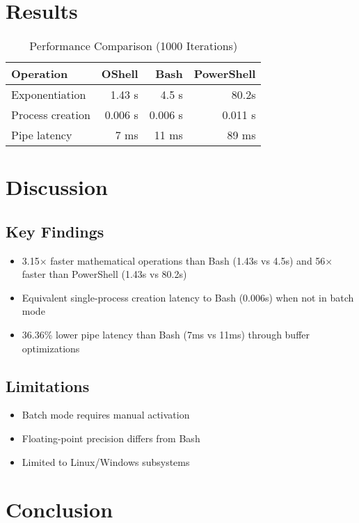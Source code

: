\documentclass[10pt,twocolumn]{article}
\begin{document}
\section{Results}

\begin{table}[ht]
\centering
\caption{Performance Comparison (1000 Iterations)}
\label{tab:results}
\begin{tabular}{@{}lrrr@{}}
\toprule
\textbf{Operation} & \textbf{OShell} & \textbf{Bash} & \textbf{PowerShell} \\
\midrule
Exponentiation & 1.43 s & 4.5 s & 80.2s \\
Process creation & 0.006 s & 0.006 s & 0.011 s \\
Pipe latency & 7 ms & 11 ms & 89 ms \\
\bottomrule
\end{tabular}
\end{table}

\section{Discussion}
\subsection{Key Findings}
\begin{itemize}
\item 3.15$\times$ faster mathematical operations than Bash (1.43s vs 4.5s) and 56$\times$ faster than PowerShell (1.43s vs 80.2s)
\item Equivalent single-process creation latency to Bash (0.006s) when not in batch mode
\item 36.36\% lower pipe latency than Bash (7ms vs 11ms) through buffer optimizations
\end{itemize}

\subsection{Limitations}
\begin{itemize}
\item Batch mode requires manual activation
\item Floating-point precision differs from Bash
\item Limited to Linux/Windows subsystems
\end{itemize}

\section{Conclusion}
\end{document}
